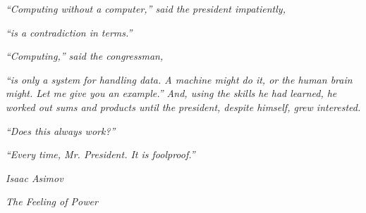 
\thispagestyle{empty}\mbox{}

\vspace*{4cm}

\small

\hfill \emph{``Computing without a computer,'' said the president impatiently,}

\hfill \emph{``is a contradiction in terms.''}

\hfill

\hfill \emph{``Computing,'' said the congressman,}

\hfill \emph{``is only a system for handling data. A machine might do it, or the %
human brain might. Let me give you an example.'' And, using the skills he had %
learned, he worked out sums and products until the president, despite himself, %
grew interested.} 

\hfill 

\hfill \emph{``Does this always work?''}

\hfill \emph{``Every time, Mr. President. It is foolproof.''}

\hfill 

\hfill \emph{Isaac Asimov}

\hfill \emph{The Feeling of Power}

\newpage
\thispagestyle{empty}\mbox{}

\newpage
